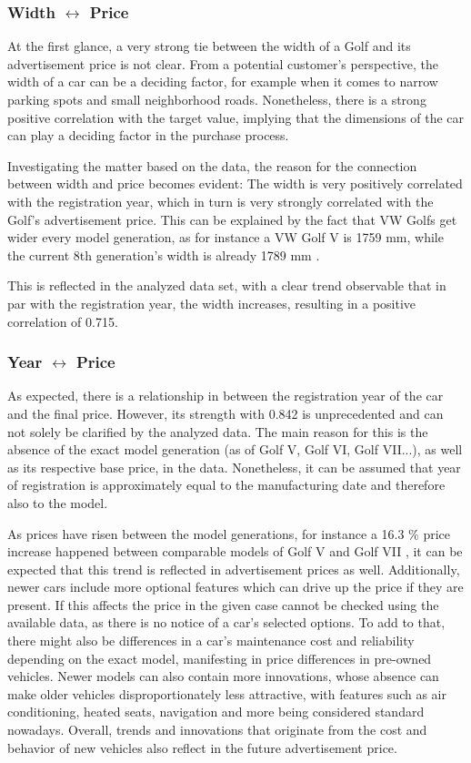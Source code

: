 \subsubsection{Width $\leftrightarrow$ Price}
At the first glance, a very strong tie between the width of a Golf and its advertisement price is not clear.
From a potential customer's perspective, the width of a car can be a deciding factor, for example when it comes to
narrow parking spots and small neighborhood roads.
Nonetheless, there is a strong positive correlation with the target value, implying that the dimensions of the car
can play a deciding factor in the purchase process.
\par
Investigating the matter based on the data, the reason for the connection between width and price becomes evident:
The width is very positively correlated with the registration year, which in turn is very strongly correlated with the Golf's advertisement price.
This can be explained by the fact that VW Golfs get wider every model generation, as for instance a VW Golf V is 1759 mm,
while the current 8th generation's width is already 1789 mm \autocite{VolkswagenGolfTechnical}.
\par
This is reflected in the analyzed data set, with a clear trend observable that in par with the registration year, the width increases,
resulting in a positive correlation of 0.715.

\subsubsection{Year $\leftrightarrow$ Price} \label{year_to_price_correlation}
As expected, there is a relationship in between the registration year of the car and the final price.
However, its strength with 0.842 is unprecedented and can not solely be clarified by the analyzed data. 
The main reason for this is the absence of the exact model generation (as of Golf V, Golf VI, Golf VII...), as well as its respective base price, in the data.
Nonetheless, it can be assumed that year of registration is approximately equal to the manufacturing date and therefore also to the model. 
\par
As prices have risen between the model generations, for instance a 16.3 \% price increase happened between comparable models of Golf V and Golf VII \autocite{DuelVWGolf},
it can be expected that this trend is reflected in advertisement prices as well. 
Additionally, newer cars include more optional features which can drive up the price if they are present.
If this affects the price in the given case cannot be checked using the available data,
as there is no notice of a car's selected options. 
\newline
To add to that, there might also be differences in a car's maintenance cost and reliability depending on the exact model, manifesting in price differences in pre-owned vehicles.
Newer models can also contain more innovations, whose absence can make older vehicles  disproportionately less attractive, with features such as air conditioning, heated seats,
navigation and more being considered standard nowadays.
\newline
Overall, trends and innovations that originate from the cost and behavior of new vehicles also reflect in the future advertisement price. 
